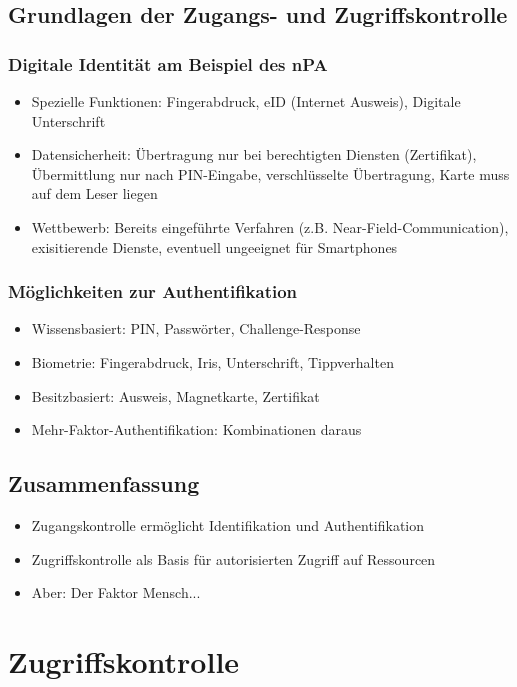 \subsection{Grundlagen der Zugangs- und Zugriffskontrolle}

\subsubsection{Digitale Identität am Beispiel des nPA}
\begin{itemize}
	\item Spezielle Funktionen: Fingerabdruck, eID (Internet Ausweis), Digitale Unterschrift
	\item Datensicherheit: Übertragung nur bei berechtigten Diensten (Zertifikat), Übermittlung nur nach PIN-Eingabe, verschlüsselte Übertragung, Karte muss auf dem Leser liegen
	\item Wettbewerb: Bereits eingeführte Verfahren (z.B. Near-Field-Communication), exisitierende Dienste, eventuell ungeeignet für Smartphones
\end{itemize}

\subsubsection{Möglichkeiten zur Authentifikation}
\begin{itemize}
	\item Wissensbasiert: PIN, Passwörter, Challenge-Response
	\item Biometrie: Fingerabdruck, Iris, Unterschrift, Tippverhalten
	\item Besitzbasiert: Ausweis, Magnetkarte, Zertifikat
	\item Mehr-Faktor-Authentifikation: Kombinationen daraus
\end{itemize}


\subsection{Zusammenfassung}
\begin{itemize}
	\item Zugangskontrolle ermöglicht Identifikation und Authentifikation
	\item Zugriffskontrolle als Basis für autorisierten Zugriff auf Ressourcen
	\item Aber: Der Faktor Mensch...
\end{itemize}


\section{Zugriffskontrolle}


